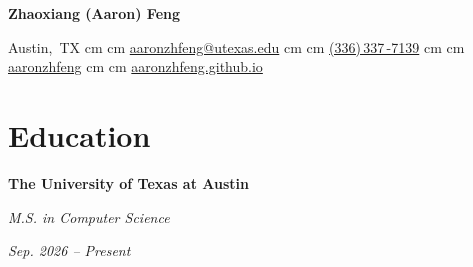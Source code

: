 \documentclass[10pt, letterpaper]{article}
\newenvironment{twocolentry}[2][]{
    \onecolentry
    \def\secondColumn{#2}
    \setcolumnwidth{\fill, 4.5 cm}
    \begin{paracol}{2}
}{
    \switchcolumn \raggedleft \secondColumn
    \end{paracol}
    \endonecolentry
}
\newenvironment{header}{
    \setlength{\topsep}{0pt}\par\kern\topsep\centering\linespread{1.5}
}{
    \par\kern\topsep
}
\newcommand{\AND}{\unskip\enspace\textbar\enspace}
\let\hrefWithoutArrow\href
\renewcommand{\href}[2]{\hrefWithoutArrow{#1}{\ifthenelse{\equal{#2}{}}{ }{#2}}}
\begin{document}
    \begin{header}
        \textbf{\fontsize{24 pt}{24 pt}\selectfont Zhaoxiang (Aaron) Feng}

        \vspace{0.3 cm}

        \small
        \mbox{{\color{black}\footnotesize\faMapMarker*}\hspace*{0.13cm}Austin, TX}%
         cm%
        \AND%
         cm%
        \mbox{\hrefWithoutArrow{mailto:aaronzhfeng@utexas.edu}{\color{black}{\footnotesize\faEnvelope[regular]}\hspace*{0.13cm}aaronzhfeng@utexas.edu}}%
         cm%
        \AND%
         cm%
        \mbox{\hrefWithoutArrow{tel:+13363377139}{\color{black}{\footnotesize\faPhone*}\hspace*{0.13cm}(336)\,337\,-7139}}%
         cm%
        \AND%
         cm%
        \mbox{\hrefWithoutArrow{https://github.com/aaronzhfeng}{\color{black}{\footnotesize\faGithub}\hspace*{0.13cm}aaronzhfeng}}%
         cm%
        \AND%
         cm%
        \mbox{\hrefWithoutArrow{https://aaronzhfeng.github.io/}{\color{black}{\footnotesize\faGlobe}\hspace*{0.13cm}aaronzhfeng.github.io}}%

    \end{header}

    \vspace{0.3 cm - 0.3 cm}

    \section{Education}

    \begin{twocolentry}{\textit{Sep. 2026 -- Present}}
        \textbf{The University of Texas at Austin}

        \textit{M.S. in Computer Science}
    \end{twocolentry}

    \vspace{0.20 cm}
\end{document}
